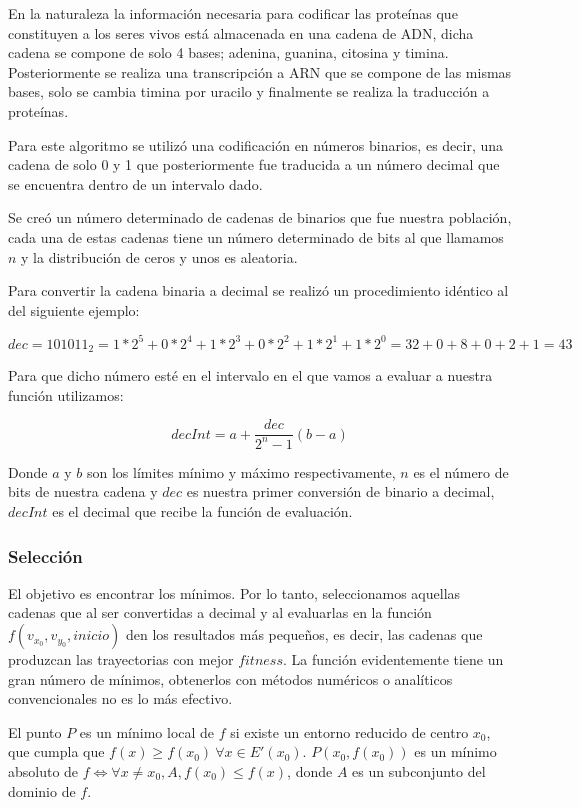 \documentclass[12pt,letterpaper]{article}
\begin{document}
En la naturaleza la información necesaria para codificar las proteínas que constituyen a los seres vivos está almacenada en una cadena de ADN, dicha cadena se compone de solo 4 bases; adenina, guanina, citosina y timina. Posteriormente se realiza una transcripción a ARN que se compone de las mismas bases, solo se cambia timina por uracilo y finalmente se realiza la traducción a proteínas. 

Para este algoritmo se utilizó una codificación en números binarios, es decir, una cadena de solo 0 y 1 que posteriormente fue traducida a un número decimal que se encuentra dentro de un intervalo dado.

Se creó un número determinado de cadenas de binarios que fue nuestra población, cada una de estas cadenas tiene un número determinado de bits al que llamamos $n$ y la distribución de ceros y unos es aleatoria.

Para convertir la cadena binaria a decimal se realizó un procedimiento idéntico al del siguiente ejemplo:

\[
dec=101011_2=1*2^5+0*2^4+1*2^3+0*2^2+1*2^1+1*2^0=32+0+8+0+2+1=43
\]

Para que dicho número esté en el intervalo en el que vamos a evaluar a nuestra función utilizamos:

\begin{equation}
decInt=a+\dfrac{dec}{2^n-1}(b-a)
\end{equation}

Donde $a$ y $b$ son los límites mínimo y máximo respectivamente, $n$ es el número de bits de nuestra cadena y $dec$ es nuestra primer conversión de binario a decimal, $decInt$ es el decimal que recibe la función de evaluación.

\subsubsection*{Selección}

El objetivo es encontrar los mínimos. Por lo tanto, seleccionamos aquellas cadenas que al ser convertidas a decimal y al evaluarlas en la función $f(v_{x_0},v_{y_0},inicio)$ den los resultados más pequeños, es decir, las cadenas que produzcan las trayectorias con mejor $fitness$. La función evidentemente tiene un gran número de mínimos, obtenerlos con métodos numéricos o analíticos convencionales no es lo más efectivo.

El punto $P$ es un mínimo local de $f$ si existe un entorno reducido de centro $x_0$, que cumpla que $f(x)\geq f(x_0) \ \forall x \in E'(x_0)$. $P(x_0,f(x_0))$ es un mínimo absoluto de $ f \Longleftrightarrow \forall x \neq x_0, A, f(x_0)\leqslant f(x)$, donde $A$ es un subconjunto del dominio de $f$.
\end{document}
